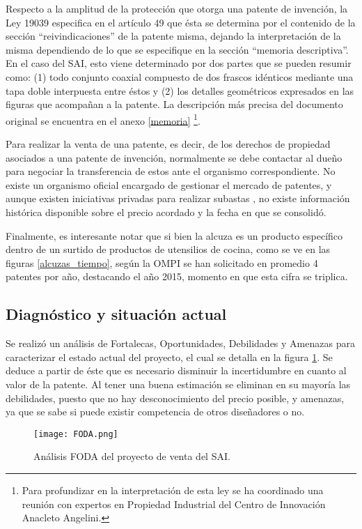 Respecto a la amplitud de la protección que otorga una patente de invención, la Ley 19039 especifica en el artículo 49 que ésta se determina por el contenido de la sección “reivindicaciones” de la patente misma, dejando la interpretación de la misma dependiendo de lo que se especifique en la sección “memoria descriptiva”. En el caso del SAI,  esto viene determinado por dos partes que se pueden resumir como: (1) todo conjunto coaxial compuesto de dos frascos idénticos mediante una tapa doble interpuesta entre éstos y (2) los detalles geométricos  expresados en las figuras que acompañan a la patente. La descripción más precisa del documento original se encuentra en el anexo \ref{memoria}
\footnote{Para profundizar en la interpretación de esta ley se ha coordinado una reunión con expertos en Propiedad Industrial del Centro de Innovación Anacleto Angelini.}.


Para realizar la venta de una patente, es decir, de los derechos de propiedad asociados a una patente de invención, normalmente se debe contactar al dueño para negociar la transferencia de estos ante el organismo correspondiente. No existe un organismo oficial encargado de gestionar el mercado de patentes, y aunque existen iniciativas privadas para realizar subastas , no existe información histórica disponible sobre el precio acordado y la fecha en que se consolidó.


Finalmente, es interesante notar que si bien la alcuza es un producto específico dentro de un surtido de productos de utensilios de cocina, como se ve en las figuras \ref{alcuzas_tiempo},
según la OMPI se han solicitado en promedio 4 patentes por año, destacando el año 2015, momento en que esta cifra se triplica.


\subsection{Diagnóstico y situación actual}

Se realizó un análisis de Fortalecas, Oportunidades, Debilidades y Amenazas para caracterizar el estado actual del proyecto, el cual se detalla en la figura \ref{foda1}. Se deduce a partir de éste que es necesario disminuir la incertidumbre en cuanto al valor de la patente. Al tener una buena estimación se eliminan en su mayoría las debilidades, puesto que no hay desconocimiento del precio posible, y amenazas, ya que se sabe si puede existir competencia de otros diseñadores o no.


\begin{figure}
  \texttt{[image: FODA.png]}
  \caption{Análisis FODA del proyecto de venta del SAI.}
  \label{foda1}
\end{figure}

